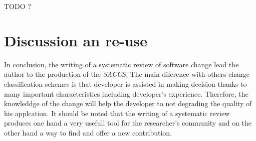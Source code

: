\documentclass[12pt]{article}
\begin{document}
TODO ?
\section{Discussion an re-use}
In conclusion, the writing of a systematic review of software change lead the author to the production of the \textit{SACCS}. The main diference with others change classification schemes is that developer is assisted in making decision thanks to many important characteristics including developer's experience. Therefore, the knowleddge of the change will help the developer to not degrading the quality of his applcation. It should be noted that the writing of a systematic review produces one hand a very usefull tool for the researcher's community and on the other hand a way to find and offer a new contribution.
\end{document}
